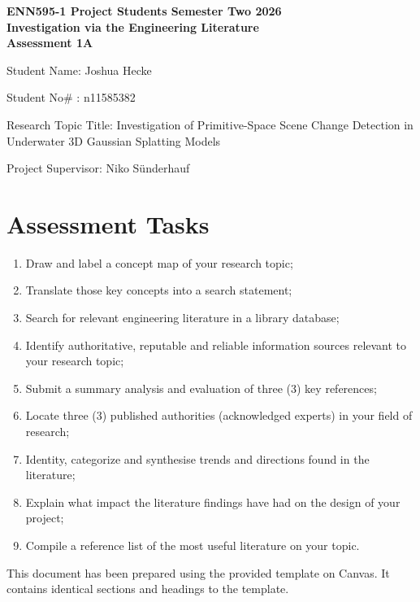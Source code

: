 \documentclass[12pt, a4paper]{article}
\begin{document}
\begin{center}
\textbf{\Large ENN595-1 Project Students Semester Two 2026} \\
\vspace{0.3cm}
\textbf{\Large Investigation via the Engineering Literature} \\
\vspace{0.3cm}
\textbf{\Large Assessment 1A} \\
\vspace{0.3cm}
\end{center}

\vspace{0.5cm}
\noindent Student Name: Joshua Hecke \\
\vspace{0.2cm}

\noindent Student No\# : n11585382 \\
\vspace{0.2cm}

\noindent Research Topic Title: Investigation of Primitive-Space Scene Change Detection in Underwater 3D Gaussian Splatting Models \\
\vspace{0.2cm}

\noindent Project Supervisor: Niko Sünderhauf \\
\vspace{0.5cm}

\section*{Assessment Tasks}
\begin{enumerate}
    \item Draw and label a concept map of your research topic;
    \item Translate those key concepts into a search statement;
    \item Search for relevant engineering literature in a library database;
    \item Identify authoritative, reputable and reliable information sources relevant to your research topic;
    \item Submit a summary analysis and evaluation of three (3) key references;
    \item Locate three (3) published authorities (acknowledged experts) in your field of research;
    \item Identity, categorize and synthesise trends and directions found in the literature;
    \item Explain what impact the literature findings have had on the design of your project;
    \item Compile a reference list of the most useful literature on your topic.
\end{enumerate}
This document has been prepared using the provided template on Canvas. It contains identical sections and headings to the template.
\end{document}
